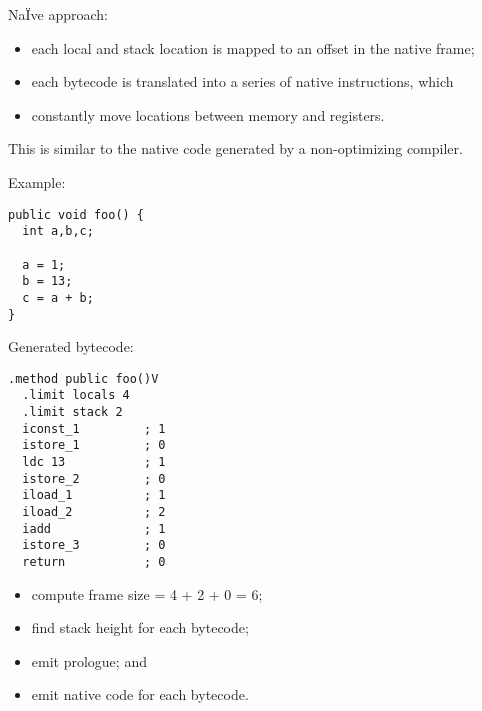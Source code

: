 \begin{slide*}
Na\"Ive approach:\\

\begin{itemize}
\item each local and stack location is mapped to an offset in the native frame; 
\item each bytecode is translated into a series of native instructions, which
\item constantly move locations between memory and registers.
\end{itemize}
\vspace*{2em}

This is similar to the native code generated by a non-optimizing compiler.
\vfil
\end{slide*}

\begin{slide*}
Example:

\begin{scriptsize}
\begin{verbatim}
public void foo() {
  int a,b,c;
 
  a = 1;
  b = 13;
  c = a + b;
}
\end{verbatim}
\end{scriptsize}

Generated bytecode:

\begin{scriptsize}
\begin{verbatim}
.method public foo()V
  .limit locals 4
  .limit stack 2
  iconst_1         ; 1
  istore_1         ; 0
  ldc 13           ; 1
  istore_2         ; 0
  iload_1          ; 1
  iload_2          ; 2
  iadd             ; 1
  istore_3         ; 0
  return           ; 0
\end{verbatim}
\end{scriptsize}

\begin{itemize}
\item compute frame size = 4 + 2 + 0 = 6;
\item find stack height for each bytecode;
\item emit prologue; and
\item emit native code for each bytecode.
\end{itemize}
\vfil
\end{slide*}

